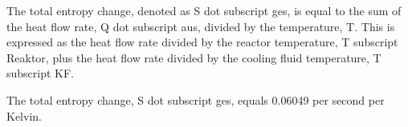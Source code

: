 The total entropy change, denoted as S dot subscript ges, is equal to the sum of the heat flow rate, Q dot subscript aus, divided by the temperature, T. This is expressed as the heat flow rate divided by the reactor temperature, T subscript Reaktor, plus the heat flow rate divided by the cooling fluid temperature, T subscript KF.

The total entropy change, S dot subscript ges, equals 0.06049 per second per Kelvin.